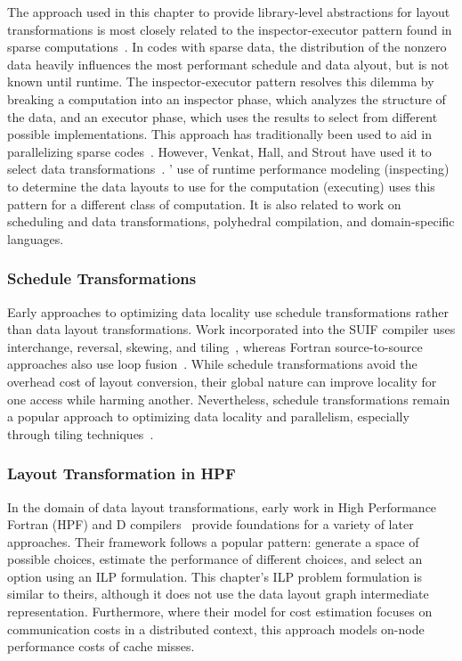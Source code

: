 The approach used in this chapter to provide library-level abstractions for layout transformations is most closely related to the inspector-executor pattern found in sparse computations~\cite{strout2018sparse}.
In codes with sparse data, the distribution of the nonzero data heavily influences the most performant schedule and data alyout, but is not known until runtime.
The inspector-executor pattern resolves this dilemma by breaking a computation into an inspector phase, which analyzes the structure of the data, and an executor phase, which uses the results to select from different possible implementations.
This approach has traditionally been used to aid in parallelizing sparse codes~\cite{ujaldon1996parallelization,fu1996run,venkat2016automating}.
However, Venkat, Hall, and Strout have used it to select data transformations~\cite{venkat2015loop}.
\FormatDecisions' use of runtime performance modeling (inspecting) to determine the data layouts to use for the computation (executing) uses this pattern for a different class of computation.
It is also related to work on scheduling and data transformations, polyhedral compilation, and domain-specific languages.

\subsubsection{Schedule Transformations}
Early approaches to optimizing data locality use schedule transformations rather than data layout transformations. 
Work incorporated into the SUIF compiler uses interchange, reversal, skewing, and tiling~\cite{wolf1991data}, whereas Fortran source-to-source approaches also use loop fusion~\cite{mckinley1996improving}.
While schedule transformations avoid the overhead cost of layout conversion, their global nature can improve locality for one access while harming another.
Nevertheless, schedule transformations remain a popular approach to optimizing data locality and parallelism, 
especially through tiling techniques~\cite{bondhugula2008pluto,bertolacci2015parameterized,bondhugula2016diamond,bandishti2012tiling,unat2016tida}.

\subsubsection{Layout Transformation in HPF}
In the domain of data layout transformations, early work in High Performance Fortran (HPF) and D compilers~\cite{bixby1994automatic,kennedy1995automatic,kennedy1998automatic} provide foundations for a variety of later approaches.
Their framework follows a popular pattern: generate a space of possible choices, estimate the performance of different choices, and select an option using an ILP formulation. 
This chapter's ILP problem formulation is similar to theirs, although it does not use the data layout graph intermediate representation.
Furthermore, where their model for cost estimation focuses on communication costs in a distributed context, this approach models on-node performance costs of cache misses.


